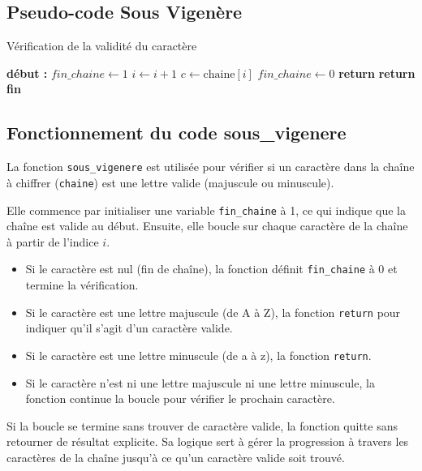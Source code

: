 \documentclass[a4paper, 12pt]{article}
\begin{document}
\newpage

\subsection{Pseudo-code Sous Vigenère}
\begin{algorithm}
\caption{Vérification de la validité du caractère}
\begin{algorithmic}[1]
\State \textbf{début :}
\State $fin\_chaine \gets 1$
    \State $i \gets i + 1$ 
    \State $c \gets \text{chaine}[i]$
        \State $fin\_chaine \gets 0$
    \EndIf
        \State \textbf{return}
        \State \textbf{return}
    \EndIf
\EndWhile
\State \textbf{fin}
\end{algorithmic}
\end{algorithm}

\subsection{Fonctionnement du code sous\_vigenere}

La fonction \texttt{sous\_vigenere} est utilisée pour vérifier si un caractère dans la chaîne à chiffrer (\texttt{chaine}) est une lettre valide (majuscule ou minuscule).

Elle commence par initialiser une variable \texttt{fin\_chaine} à 1, ce qui indique que la chaîne est valide au début. Ensuite, elle boucle sur chaque caractère de la chaîne à partir de l'indice \(i\).

\begin{itemize}
    \item Si le caractère est nul (fin de chaîne), la fonction définit \texttt{fin\_chaine} à 0 et termine la vérification.
    \item Si le caractère est une lettre majuscule (de A à Z), la fonction \texttt{return} pour indiquer qu'il s'agit d'un caractère valide.
    \item Si le caractère est une lettre minuscule (de a à z), la fonction \texttt{return}.
    \item Si le caractère n'est ni une lettre majuscule ni une lettre minuscule, la fonction continue la boucle pour vérifier le prochain caractère.
\end{itemize}

Si la boucle se termine sans trouver de caractère valide, la fonction quitte sans retourner de résultat explicite. Sa logique sert à gérer la progression à travers les caractères de la chaîne jusqu'à ce qu'un caractère valide soit trouvé.
\end{document}

